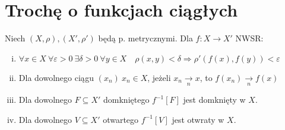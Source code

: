 \section{Trochę o funkcjach ciągłych}
\begin{tw}[o ciągłości] 
    Niech $(X,\rho), (X',\rho ')$ będą p. metrycznymi. Dla $f: X \rightarrow X'$ NWSR:
    \begin{enumerate}[(i)]
        \item $\forall x \in X \ \forall \varepsilon > 0 \ \exists \delta > 0 \ \forall y \in X \quad \rho(x,y) < \delta \Rightarrow \rho'(f(x),f(y)) < \varepsilon$
        \item Dla dowolnego ciągu $(x_n) \ x_n \in X$, jeżeli $x_n \underset{n}{\rightarrow} x$, to $f(x_n) \underset{n}{\rightarrow} f(x)$
        \item Dla dowolnego $F \subseteq X'$ domkniętego $f^{-1}[F]$ jest domknięty w $X$.
        \item Dla dowolnego $V \subseteq X'$ otwartego $f^{-1}[V]$ jest otwraty w $X$.
    \end{enumerate}
\end{tw} 

